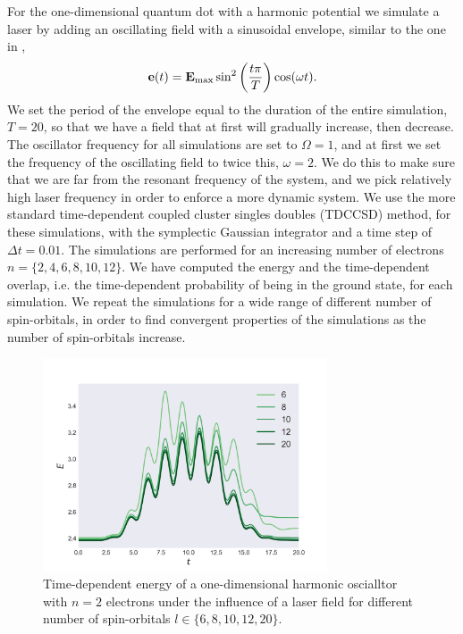 For the one-dimensional quantum dot with a harmonic potential we simulate a laser by 
adding an oscillating 
field with a sinusoidal envelope, similar to the one in
\citeauthor{pedersen2019symplectic}\cite{pedersen2019symplectic},
\begin{equation}
    \label{eq:results_1d_field}
    \vb{e}(t) = \vb{E}_\text{max}\sin^2\left(\frac{t\pi}{T}\right)\cos(\omega t).
\end{equation}
We set the period of the envelope equal to the duration of the entire simulation,
$T=20$, so that we have a field that at first will gradually increase, then decrease.
The oscillator frequency for all simulations are set to $\Omega=1$, and at first we 
set the frequency of the oscillating field to twice this, $\omega = 2$. We do this 
to make sure that we are far from the resonant frequency of the system, and we pick 
relatively high laser frequency in order to enforce a more dynamic system. We use the 
more standard time-dependent coupled cluster singles doubles (TDCCSD) method, for 
these simulations, with the symplectic Gaussian integrator and a time step of
$\Delta t=0.01$.
The simulations are performed for an increasing number of electrons
$n = \{2,4,6,8,10,12\}$. We have computed the energy and the time-dependent overlap,
i.e. the time-dependent probability of being in the ground state, for each simulation.
We repeat the simulations for a wide range of different number of spin-orbitals,
in order to find convergent properties of the simulations as the number of spin-orbitals increase.

\begin{figure}[ht]
    \centering
    \includegraphics[width=0.75\textwidth]{results/figures/1D/n=2energy.png} 
    \caption{Time-dependent energy of a one-dimensional harmonic oscialltor 
        with $n=2$ electrons
        under the influence of a laser field for different number of spin-orbitals
        $l\in\{6,8,10,12,20\}$.
    }
    \label{fig:1d_n2_E}
\end{figure}

